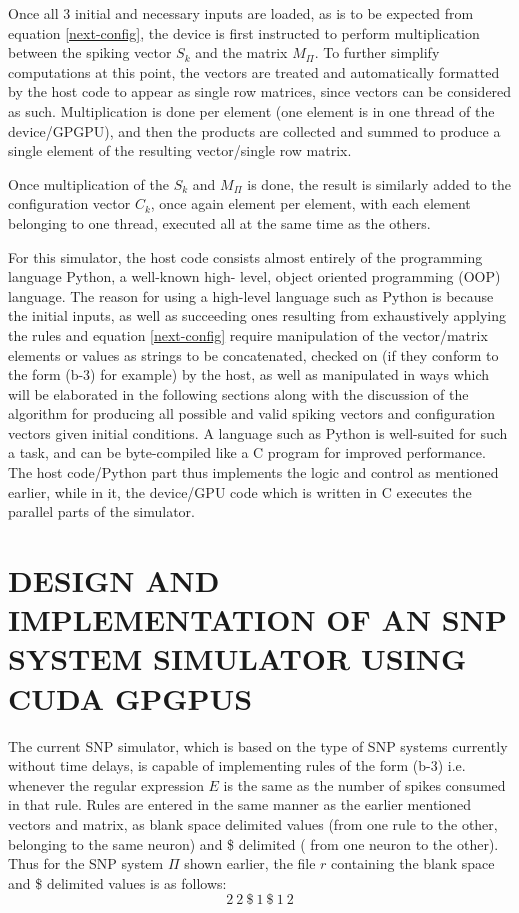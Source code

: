 \documentclass{acm_proc_article-sp}
\begin{document}
Once all 3 initial and necessary inputs are loaded, as is to be
expected from equation \ref{next-config}, the device is first instructed to
perform multiplication between the spiking vector $S_k$ and the
matrix $M_{\Pi}$. To further simplify computations at this point, the
vectors are treated and automatically formatted by the host
code to appear as single row matrices, since vectors can be
considered as such. Multiplication is done per element (one
element is in one thread of the device/GPGPU), and then the
products are collected and summed to produce a single
element of the resulting vector/single row matrix.

Once multiplication of the $S_k$ and $M_{\Pi}$ is done,
the result is similarly added to the configuration vector $C_k$, once
again element per element, with each element belonging to
one thread, executed all at the same time as the others.

For this simulator, the host code consists almost entirely of
the programming language Python, a well-known high-
level, object oriented programming (OOP) language. The
reason for using a high-level language such as Python is
because the initial inputs, as well as succeeding ones
resulting from exhaustively applying the rules and equation
\ref{next-config} require manipulation of the vector/matrix elements or
values as strings to be concatenated, checked on (if they
conform to the form (b-3) for example) by the host, as well
as manipulated in ways which will be elaborated in the
following sections along with the discussion of the
algorithm for producing all possible and valid spiking
vectors and configuration vectors given initial conditions. A
language such as Python is well-suited for such a task, and
can be byte-compiled like a C program for improved
performance. The host code/Python part thus implements the
logic and control as mentioned earlier, while in it, the
device/GPU code which is written in C executes the parallel
parts of the simulator.

\section{DESIGN AND IMPLEMENTATION OF AN
SNP SYSTEM SIMULATOR USING CUDA
GPGPUS
}\label{sect-snp-algo}

The current SNP simulator, which is based on the type of
SNP systems currently without time delays, is capable of
implementing rules of the form (b-3) i.e. whenever the
regular expression $E$ is the same as the number of spikes
consumed in that rule. Rules are entered in the same manner
as the earlier mentioned vectors and matrix, as blank space
delimited values (from one rule to the other, belonging to the same neuron) and \$ delimited ( from one neuron to the
other). Thus for the SNP system ${\Pi}$ shown earlier, the file $r$
containing the blank space and \$ delimited values is as
follows:
\begin{equation}\label{rules}
2~2~\$~1~\$~1~2
\end{equation}
\end{document}
